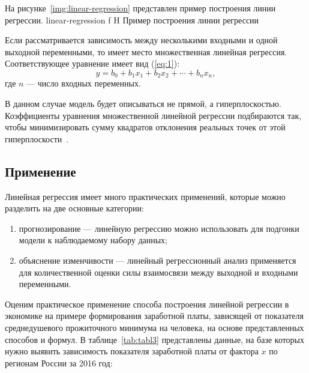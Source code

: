 На рисунке~\ref{img:linear-regression} представлен пример построения линии регрессии.
{linear-regression}
{f}
{H}
{\textwidth}
{Пример построения линии регрессии}

Если рассматривается зависимость между несколькими входными и одной выходной переменными, то имеет место множественная линейная регрессия.
Соответствующее уравнение имеет вид (\ref{eq:1}):
\begin{equation}
    y = b_0 + b_1 x_1 + b_2 x_2 + \cdots+ b_n x_n,
    \label{eq:1}
\end{equation}
где $n$ --- число входных переменных.

В данном случае модель будет описываться не прямой, а гиперплоскостью.
Коэффициенты уравнения множественной линейной регрессии подбираются так, чтобы минимизировать сумму квадратов отклонения реальных точек от этой гиперплоскости~\cite{loginom}.

\subsection*{Применение}

Линейная регрессия имеет много практических применений, которые можно разделить на две основные категории:
\begin{enumerate}[label=\arabic*), leftmargin=1.6\parindent]
    \item прогнозирование --- линейную регрессию можно использовать для подгонки модели к наблюдаемому набору данных;
    \item объяснение изменчивости --- линейный регрессионный анализ применяется для количественной оценки силы взаимосвязи между выходной и входными переменными.
\end{enumerate}

Оценим практическое применение способа построения линейной регрессии в экономике на примере формирования заработной платы, зависящей от показателя среднедушевого прожиточного минимума на человека, на основе представленных способов и формул.
В таблице~\ref{tab:tabl3} представлены данные, на базе которых нужно выявить зависимость показателя заработной платы от фактора $x$ по регионам России за 2016 год:

